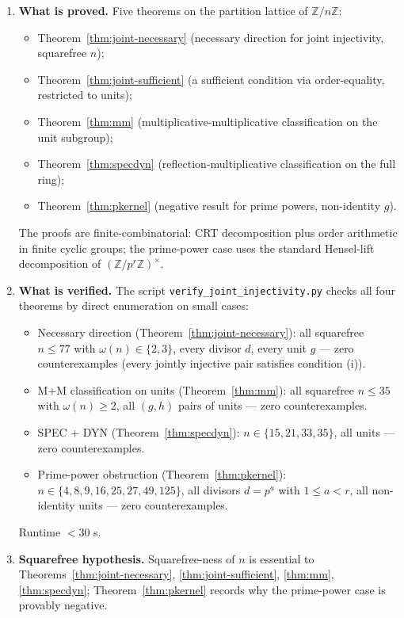 \documentclass[11pt,reqno]{amsart}
\theoremstyle{plain}
\theoremstyle{definition}
\theoremstyle{remark}
\newcommand{\Z}{\mathbb{Z}}
\begin{document}
\begin{enumerate}[label={\upshape(\arabic*)}]
\item \textbf{What is proved.} Five theorems on the partition lattice
of $\Z/n\Z$:
\begin{itemize}
\item Theorem~\ref{thm:joint-necessary} (necessary direction for
joint injectivity, squarefree $n$);
\item Theorem~\ref{thm:joint-sufficient} (a sufficient condition via
order-equality, restricted to units);
\item Theorem~\ref{thm:mm} (multiplicative-multiplicative
classification on the unit subgroup);
\item Theorem~\ref{thm:specdyn} (reflection-multiplicative
classification on the full ring);
\item Theorem~\ref{thm:pkernel} (negative result for prime powers,
non-identity $g$).
\end{itemize}
The proofs are finite-combinatorial: CRT decomposition plus order
arithmetic in finite cyclic groups; the prime-power case uses the
standard Hensel-lift decomposition of $(\Z/p^{r}\Z)^{\times}$.

\item \textbf{What is verified.} The script
\texttt{verify\_joint\_injectivity.py} checks all four theorems by
direct enumeration on small cases:
\begin{itemize}
\item Necessary direction (Theorem~\ref{thm:joint-necessary}):
all squarefree $n \le 77$ with $\omega(n) \in \{2, 3\}$, every
divisor $d$, every unit $g$ --- zero counterexamples (every jointly
injective pair satisfies condition (i)).
\item M+M classification on units (Theorem~\ref{thm:mm}):
all squarefree $n \le 35$ with $\omega(n) \ge 2$, all $(g, h)$ pairs
of units --- zero counterexamples.
\item SPEC + DYN (Theorem~\ref{thm:specdyn}):
$n \in \{15, 21, 33, 35\}$, all units --- zero counterexamples.
\item Prime-power obstruction (Theorem~\ref{thm:pkernel}):
$n \in \{4, 8, 9, 16, 25, 27, 49, 125\}$, all divisors $d = p^{a}$
with $1 \le a < r$, all non-identity units --- zero counterexamples.
\end{itemize}
Runtime $< 30$ s.

\item \textbf{Squarefree hypothesis.} Squarefree-ness of $n$ is
essential to Theorems~\ref{thm:joint-necessary},
\ref{thm:joint-sufficient}, \ref{thm:mm}, \ref{thm:specdyn};
Theorem~\ref{thm:pkernel} records why the prime-power case is
provably negative.


\end{enumerate}
\end{document}
